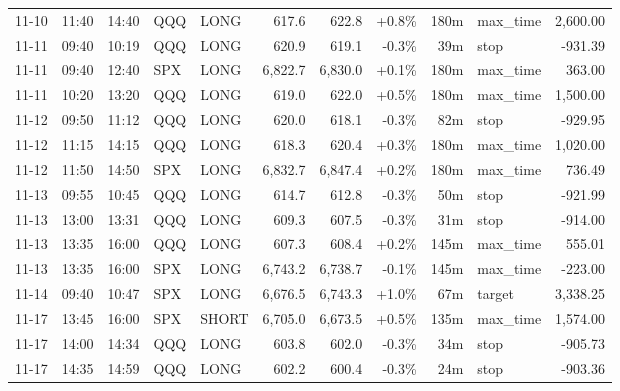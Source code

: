 \documentclass[11pt,a4paper,twoside]{article}
\begin{document}
\begin{center}
\begin{longtable}{>{\color{txtmain}}l l l l l r r r r >{\color{txtmain}}l r}
11-10 & 11:40 & 14:40 & QQQ & LONG & 617.6 & 622.8 & \textcolor{wingreen}{+0.8\%} & 180m & max\_time & \textcolor{wingreen}{2,600.00} \\
11-11 & 09:40 & 10:19 & QQQ & LONG & 620.9 & 619.1 & \textcolor{lossred}{-0.3\%} & 39m & stop & \textcolor{lossred}{-931.39} \\
11-11 & 09:40 & 12:40 & SPX & LONG & 6,822.7 & 6,830.0 & \textcolor{wingreen}{+0.1\%} & 180m & max\_time & \textcolor{wingreen}{363.00} \\
11-11 & 10:20 & 13:20 & QQQ & LONG & 619.0 & 622.0 & \textcolor{wingreen}{+0.5\%} & 180m & max\_time & \textcolor{wingreen}{1,500.00} \\
11-12 & 09:50 & 11:12 & QQQ & LONG & 620.0 & 618.1 & \textcolor{lossred}{-0.3\%} & 82m & stop & \textcolor{lossred}{-929.95} \\
11-12 & 11:15 & 14:15 & QQQ & LONG & 618.3 & 620.4 & \textcolor{wingreen}{+0.3\%} & 180m & max\_time & \textcolor{wingreen}{1,020.00} \\
11-12 & 11:50 & 14:50 & SPX & LONG & 6,832.7 & 6,847.4 & \textcolor{wingreen}{+0.2\%} & 180m & max\_time & \textcolor{wingreen}{736.49} \\
11-13 & 09:55 & 10:45 & QQQ & LONG & 614.7 & 612.8 & \textcolor{lossred}{-0.3\%} & 50m & stop & \textcolor{lossred}{-921.99} \\
11-13 & 13:00 & 13:31 & QQQ & LONG & 609.3 & 607.5 & \textcolor{lossred}{-0.3\%} & 31m & stop & \textcolor{lossred}{-914.00} \\
11-13 & 13:35 & 16:00 & QQQ & LONG & 607.3 & 608.4 & \textcolor{wingreen}{+0.2\%} & 145m & max\_time & \textcolor{wingreen}{555.01} \\
11-13 & 13:35 & 16:00 & SPX & LONG & 6,743.2 & 6,738.7 & \textcolor{lossred}{-0.1\%} & 145m & max\_time & \textcolor{lossred}{-223.00} \\
11-14 & 09:40 & 10:47 & SPX & LONG & 6,676.5 & 6,743.3 & \textcolor{wingreen}{+1.0\%} & 67m & target & \textcolor{wingreen}{3,338.25} \\
11-17 & 13:45 & 16:00 & SPX & SHORT & 6,705.0 & 6,673.5 & \textcolor{wingreen}{+0.5\%} & 135m & max\_time & \textcolor{wingreen}{1,574.00} \\
11-17 & 14:00 & 14:34 & QQQ & LONG & 603.8 & 602.0 & \textcolor{lossred}{-0.3\%} & 34m & stop & \textcolor{lossred}{-905.73} \\
11-17 & 14:35 & 14:59 & QQQ & LONG & 602.2 & 600.4 & \textcolor{lossred}{-0.3\%} & 24m & stop & \textcolor{lossred}{-903.36} \\

\end{longtable}
\end{center}
\end{document}
